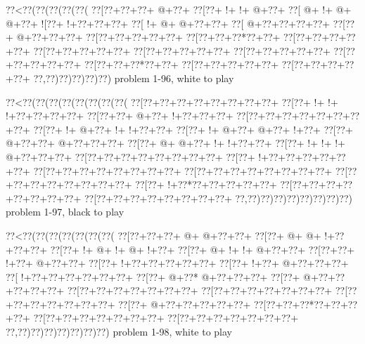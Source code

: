 \vbox{\vbox{\goo
\0??<\0??(\0??(\0??(\0??(\0??(
\0??[\0??+\0??+\0??+\- @+\0??+
\0??[\0??+\- !+\- !+\- @+\0??+
\0??[\- @+\- !+\- @+\- @+\0??+
\- ![\0??+\- !+\0??+\0??+\0??+
\0??[\- !+\- @+\- @+\0??+\0??+
\0??[\- @+\0??+\0??+\0??+\0??+
\0??[\0??+\- @+\0??+\0??+\0??+
\0??[\0??+\0??+\0??+\0??+\0??+
\0??[\0??+\0??+\0??*\0??+\0??+
\0??[\0??+\0??+\0??+\0??+\0??+
\0??[\0??+\0??+\0??+\0??+\0??+
\0??[\0??+\0??+\0??+\0??+\0??+
\0??[\0??+\0??+\0??+\0??+\0??+
\0??[\0??+\0??+\0??+\0??+\0??+
\0??[\0??+\0??+\0??*\0??+\0??+
\0??[\0??+\0??+\0??+\0??+\0??+
\0??[\0??+\0??+\0??+\0??+\0??+
\0??,\0??)\0??)\0??)\0??)\0??)
}
\hfil problem 1-96, white to play\hfil\break
}

\vbox{\vbox{\goo
\0??<\0??(\0??(\0??(\0??(\0??(\0??(\0??(\0??(
\0??[\0??+\0??+\0??+\0??+\0??+\0??+\0??+\0??+
\0??[\0??+\- !+\- !+\- !+\0??+\0??+\0??+\0??+
\0??[\0??+\0??+\- @+\0??+\- !+\0??+\0??+\0??+
\0??[\0??+\0??+\0??+\0??+\0??+\0??+\0??+\0??+
\0??[\0??+\- !+\- @+\0??+\- !+\- !+\0??+\0??+
\0??[\0??+\- !+\- @+\0??+\- @+\0??+\- !+\0??+
\0??[\0??+\- @+\0??+\0??+\- @+\0??+\0??+\0??+
\0??[\0??+\- @+\- @+\0??+\- !+\- !+\0??+\0??+
\0??[\0??+\- !+\- !+\- !+\- @+\0??+\0??+\0??+
\0??[\0??+\0??+\0??+\0??+\0??+\0??+\0??+\0??+
\0??[\0??+\- !+\0??+\0??+\0??+\0??+\0??+\0??+
\0??[\0??+\0??+\0??+\0??+\0??+\0??+\0??+\0??+
\0??[\0??+\0??+\0??+\0??+\0??+\0??+\0??+\0??+
\0??[\0??+\0??+\0??+\0??+\0??+\0??+\0??+\0??+
\0??[\0??+\- !+\0??*\0??+\0??+\0??+\0??+\0??+
\0??[\0??+\0??+\0??+\0??+\0??+\0??+\0??+\0??+
\0??[\0??+\0??+\0??+\0??+\0??+\0??+\0??+\0??+
\0??,\0??)\0??)\0??)\0??)\0??)\0??)\0??)\0??)
}
\hfil problem 1-97, black to play\hfil\break
}

\vbox{\vbox{\goo
\0??<\0??(\0??(\0??(\0??(\0??(\0??(\0??(
\0??[\0??+\0??+\0??+\- @+\- @+\0??+\0??+
\0??[\0??+\- @+\- @+\- !+\0??+\0??+\0??+
\0??[\0??+\- !+\- @+\- !+\- @+\- !+\0??+
\0??[\0??+\- @+\- !+\- !+\- @+\0??+\0??+
\0??[\0??+\0??+\- !+\0??+\- @+\0??+\0??+
\0??[\0??+\- !+\0??+\0??+\0??+\0??+\0??+
\0??[\0??+\- !+\0??+\- @+\0??+\0??+\0??+
\0??[\- !+\0??+\0??+\0??+\0??+\0??+\0??+
\0??[\0??+\- @+\0??*\- @+\0??+\0??+\0??+
\0??[\0??+\- @+\0??+\0??+\0??+\0??+\0??+
\0??[\0??+\0??+\0??+\0??+\0??+\0??+\0??+
\0??[\0??+\0??+\0??+\0??+\0??+\0??+\0??+
\0??[\0??+\0??+\0??+\0??+\0??+\0??+\0??+
\0??[\0??+\- @+\0??+\0??+\0??+\0??+\0??+
\0??[\0??+\0??+\0??*\0??+\0??+\0??+\0??+
\0??[\0??+\0??+\0??+\0??+\0??+\0??+\0??+
\0??[\0??+\0??+\0??+\0??+\0??+\0??+\0??+
\0??,\0??)\0??)\0??)\0??)\0??)\0??)\0??)
}
\hfil problem 1-98, white to play\hfil\break
}

